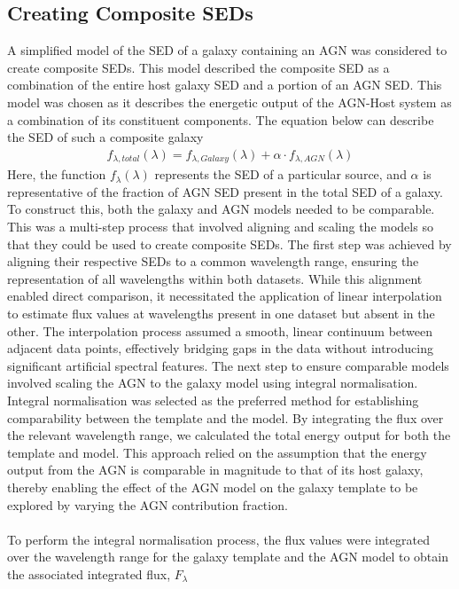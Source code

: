 \subsection{Creating Composite SEDs}
A simplified model of the SED of a galaxy containing an AGN was considered to create composite SEDs. This model described the composite SED as a combination of the entire host galaxy SED and a portion of an AGN SED. This model was chosen as it describes the energetic output of the AGN-Host system as a combination of its constituent components. The equation below can describe the SED of such a composite galaxy
\begin{align*}
    f_{\lambda, total}(\lambda) = f_{\lambda, Galaxy}(\lambda) + \alpha \cdot f_{\lambda, AGN}(\lambda) 
\end{align*}
Here, the function $f_{\lambda}(\lambda)$ represents the SED of a particular source, and $\alpha$ is representative of the fraction of AGN SED present in the total SED of a galaxy. To construct this, both the galaxy and AGN models needed to be comparable. This was a multi-step process that involved aligning and scaling the models so that they could be used to create composite SEDs. The first step was achieved by aligning their respective SEDs to a common wavelength range, ensuring the representation of all wavelengths within both datasets. While this alignment enabled direct comparison, it necessitated the application of linear interpolation to estimate flux values at wavelengths present in one dataset but absent in the other. The interpolation process assumed a smooth, linear continuum between adjacent data points, effectively bridging gaps in the data without introducing significant artificial spectral features. The next step to ensure comparable models involved scaling the AGN to the galaxy model using integral normalisation. Integral normalisation was selected as the preferred method for establishing comparability between the template and the model. By integrating the flux over the relevant wavelength range, we calculated the total energy output for both the template and model. This approach relied on the assumption that the energy output from the AGN is comparable in magnitude to that of its host galaxy, thereby enabling the effect of the AGN model on the galaxy template to be explored by varying the AGN contribution fraction. \\\\To perform the integral normalisation process, the flux values were integrated over the wavelength range for the galaxy template and the AGN model to obtain the associated integrated flux, $F_{\lambda}$
